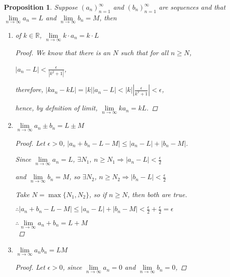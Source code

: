 \documentclass[12pt]{article}
\newcommand{\abs}[1]{\left| #1 \right|}
\theoremstyle{plain}
\newtheorem{proposition}{Proposition}[subsection]
\newcommand{\dlim}{\displaystyle\lim\limits}
\begin{document}
    \begin{proposition}
        Suppose $(a_n)_{n=1}^\infty$ and $(b_n)_{n=1}^\infty$ are sequences
        and that $\dlim_{n\to\infty} a_n = L$ and $\dlim_{n\to\infty} b_n = M$, 
        then
        \begin{enumerate}
            \item of $k \in\mathbb{R}$, $\dlim_{n\to\infty} k \cdot a_n = k\cdot L$\\
            \begin{proof}
                We know that there is an $N$ such that for all $n\geq N$, 

                $\abs{a_n-L}<\frac{\epsilon}{\abs{k^2+1}}$, 

                therefore, $\abs{ka_n-kL}=\abs{k}\abs{a_n-L}
                <\abs{k}\abs{\frac{\epsilon}{k^2+1}}<\epsilon$,

                hence, by defnition of limit, $\dlim_{n\to\infty} ka_n = kL$.
            \end{proof}

            \item $\dlim_{n\to\infty} a_n\pm b_n = L\pm M$
            \begin{proof}
                Let $\epsilon > 0$, 
                $\abs{a_n+b_n-L-M} \leq \abs{a_n-L}+\abs{b_n-M}$.

                Since $\dlim_{n\to\infty} a_n = L$, $\exists N_1$, 
                $n\geq N_1 \Rightarrow \abs{a_n -L }< \frac{\epsilon}2$

                and $\dlim_{n\to\infty} b_n = M$, so $\exists N_2$, 
                $n\geq N_2 \Rightarrow \abs{b_n -L }< \frac{\epsilon}2$

                Take $N = \max\{N_1, N_2\}$, so if $n\geq N$, then both
                are true.
                
                $\therefore \abs{a_n+b_n-L-M}\leq \abs{a_n-L}+\abs{b_n-M}
                <\frac{\epsilon}2 + \frac{\epsilon}2 = \epsilon$

                $\therefore \dlim_{n\to\infty} a_n+b_n = L+M$\\
            \end{proof}
            
            \item $\dlim_{n\to\infty} a_n b_n = LM$
            \begin{proof}
                Let $\epsilon>0$, since $\dlim_{n\to \infty} a_n=0$ 
                and $\dlim_{n\to \infty} b_n = 0$,


\end{proof}
\end{enumerate}
\end{proposition}
\end{document}
